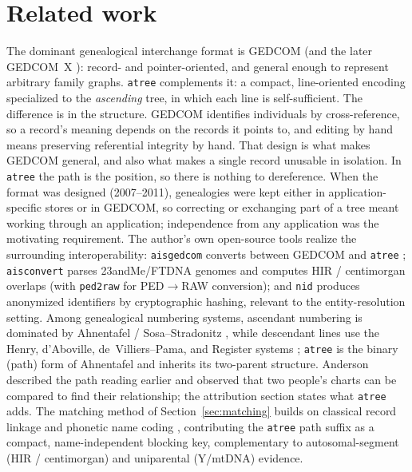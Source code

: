 \documentclass[11pt]{article}
\newcommand{\atree}{\texttt{atree}}
\begin{document}
\section{Related work}
\label{sec:related}
The dominant genealogical interchange format is GEDCOM \cite{gedcom55} (and the later GEDCOM~X
\cite{gedcomx}):
record- and pointer-oriented, and general enough to represent arbitrary family graphs. \atree{}
complements it: a compact, line-oriented encoding specialized to the \emph{ascending} tree, in
which each line is self-sufficient. The difference is in the structure. GEDCOM identifies individuals by cross-reference, so a record's meaning depends on the
records it points to, and editing by hand means preserving referential integrity by hand. That design
is what makes GEDCOM general, and also what makes a single record unusable in isolation. In \atree{}
the path is the position, so there is nothing to dereference. When the format was designed
(2007--2011), genealogies were kept either in application-specific stores or in GEDCOM, so correcting
or exchanging part of a tree meant working through an application; independence from any application
was the motivating requirement. The author's own open-source tools
realize the surrounding interoperability: \texttt{aisgedcom} converts between GEDCOM and \atree{}
\cite{aisgedcom}; \texttt{aisconvert} \cite{aisconvert} parses 23andMe/FTDNA genomes and computes
HIR / centimorgan overlaps (with \texttt{ped2raw} \cite{ped2raw} for PED$\to$RAW conversion); and
\texttt{nid} \cite{nid} produces anonymized identifiers by cryptographic hashing, relevant to the
entity-resolution setting. Among genealogical numbering systems,
ascendant numbering is dominated by Ahnentafel / Sosa--Stradonitz \cite{eytzinger1590,
wiki_ahnentafel}, while descendant lines use the Henry, d'Aboville, de~Villiers--Pama, and Register
systems \cite{wiki_gns}; \atree{} is the binary (path) form of Ahnentafel and inherits its two-parent structure.
Anderson~\cite{anderson1995} described the path reading earlier and observed that two people's charts
can be compared to find their relationship; the attribution section states what \atree{} adds. The
matching method of Section~\ref{sec:matching} builds on classical record linkage \cite{fellegi1969}
and phonetic name coding \cite{russell1918, philips1990}, contributing the \atree{} path suffix as a
compact, name-independent blocking key, complementary to autosomal-segment (HIR / centimorgan) and
uniparental (Y/mtDNA) evidence.
\end{document}
